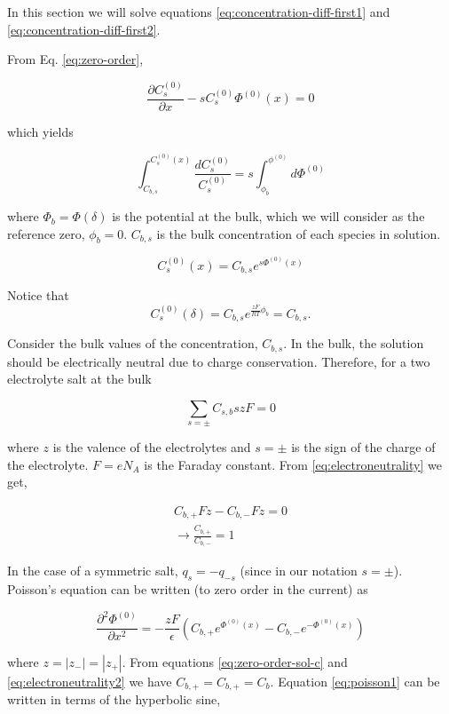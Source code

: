 In this section we will solve equations \ref{eq:concentration-diff-first1} and \ref{eq:concentration-diff-first2}. 

From Eq. \ref{eq:zero-order},

$$\frac{\partial C^{(0)}_s}{\partial x}-sC^{(0)}_s\Phi^{(0)}(x)= 0$$

which yields

$$\int_{C_{b,s}}^{C^{(0)}_s(x)} \frac{dC^{(0)}_s}{C^{(0)}_s}=s\int_{\phi_b}^{\phi^{(0)}} d\Phi^{(0)}$$

where $\Phi_b = \Phi(\delta)$ is the potential at the bulk, which we will consider as the reference zero, $\phi_b = 0$. $C_{b,s}$ is the bulk concentration of each species in solution.

$$C^{(0)}_s(x)=C_{b,s}e^{s\Phi^{(0)}(x)}$$

Notice that 
\begin{equation}
C^{(0)}_s(\delta) = C_{b,s}e^{\frac{zF}{RT}\phi_b}=C_{b,s}.
\label{eq:zero-order-sol-c}
\end{equation}

Consider the bulk values of the concentration, $C_{b,s}$. In the bulk, the solution should be electrically neutral due to charge conservation. Therefore, for a two electrolyte salt at the bulk

\begin{equation}
\label{eq:electroneutrality}
\sum_{s=\pm} C_{s,b} sz F = 0
\end{equation}


where $z$ is the valence of the electrolytes and $s = \pm$ is the sign of the charge of the electrolyte. $F = eN_A$ is the Faraday constant. From \ref{eq:electroneutrality} we get,

\begin{eqnarray}\nonumber
C_{b,+}Fz-C_{b,-}Fz=0\\
\rightarrow \frac{C_{b,+}}{C_{b,-}}=1
\label{eq:electroneutrality2}
\end{eqnarray}


In the case of a symmetric salt, $q_s=-q_{-s}$ (since in our notation $s=\pm$). Poisson's equation can be written (to zero order in the current) as

\begin{equation}
\label{eq:poisson1}
\frac{\partial^2 \Phi^{(0)}}{\partial x^2} = -\frac{zF}{\epsilon} \left(C_{b,+}e^{\Phi^{(0)}(x)}-C_{b,-}e^{-\Phi^{(0)}(x)}\right)
\end{equation}

where $z=|z_-|=|z_+|$. From equations \ref{eq:zero-order-sol-c}  and \ref{eq:electroneutrality2} we have $C_{b,+}=C_{b,+} = C_b$. Equation \ref{eq:poisson1} can be written in terms of the hyperbolic sine,

